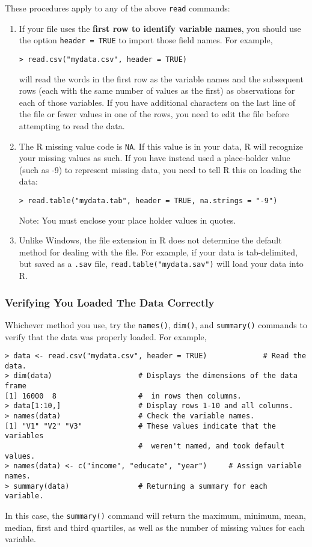 \documentclass{article}
\begin{document}
These procedures apply to any of the above {\tt read} commands:
\begin{enumerate}
\item If your file uses the \textbf{first row to identify variable
    names}, you should use the option \texttt{header = TRUE} to import
  those field names.  For example,
\begin{verbatim}  
> read.csv("mydata.csv", header = TRUE)
\end{verbatim}
  will read the words in the first row as the variable names and the
  subsequent rows (each with the same number of values as the first)
  as observations for each of those variables. If you have additional
  characters on the last line of the file or fewer values in one of
  the rows, you need to edit the file before attempting to read the
  data.
\item The R missing value code is \texttt{NA}.  If this value is in
  your data, R will recognize your missing values as such.  If you
  have instead used a place-holder value (such as -9) to represent
  missing data, you need to tell R this on loading the data:
\begin{verbatim}
> read.table("mydata.tab", header = TRUE, na.strings = "-9")
\end{verbatim}
  Note: You must enclose your place holder values in quotes.
\item Unlike Windows, the file extension in R does not determine the
  default method for dealing with the file.  For example, if your data
  is tab-delimited, but saved as a {\tt .sav} file,
  \texttt{read.table("mydata.sav")} will load your data into R.
\end{enumerate}

\subsubsection*{Verifying You Loaded The Data Correctly}

Whichever method you use, try the \texttt{names()}, \texttt{dim()},
and \texttt{summary()} commands to verify that the data was properly
loaded.  For example,
\begin{verbatim}
> data <- read.csv("mydata.csv", header = TRUE)             # Read the data.
> dim(data)                    # Displays the dimensions of the data frame
[1] 16000  8                   #  in rows then columns.   
> data[1:10,]                  # Display rows 1-10 and all columns.
> names(data)                  # Check the variable names.
[1] "V1" "V2" "V3"             # These values indicate that the variables  
                               #  weren't named, and took default values.
> names(data) <- c("income", "educate", "year")     # Assign variable names. 
> summary(data)                # Returning a summary for each variable.  
\end{verbatim}
In this case, the {\tt summary()} command will return the maximum,
minimum, mean, median, first and third quartiles, as well as the
number of missing values for each variable.
\end{document}
